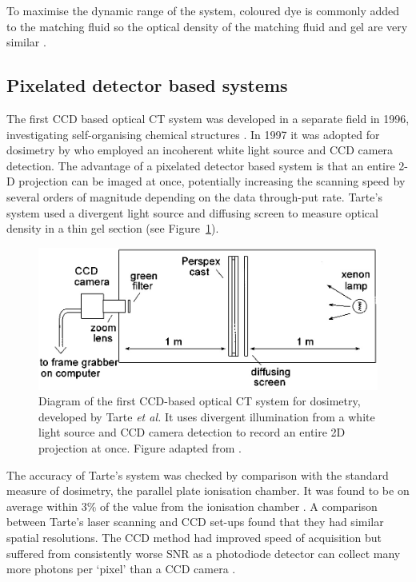 	To maximise the dynamic range of the system, coloured dye is commonly added to the matching fluid so the optical density of the matching fluid and gel are very similar \cite{Krstajic:2006kna}. 
	
	
	
	
	\subsection{Pixelated detector based systems}
	
	The first CCD based optical CT system was developed in a separate field in 1996, investigating self-organising chemical structures \cite{Winfree:1996}.
	In 1997 it was adopted for dosimetry by \cite{Tarte:2007} who employed an incoherent white light source and CCD camera detection. The advantage  of a pixelated detector based system  is that an entire 2-D projection can be imaged at once, potentially increasing the scanning speed by several  orders of magnitude depending on the data through-put rate. Tarte's system used a divergent light source and diffusing screen to measure optical density in a thin gel section (see Figure~\ref{fig:tarte_ccd_setup}). 
	
	\begin{figure}[H]
		\centering
		\includegraphics[scale=0.4]{intro_img/Tarte_1997_ccdsetup.jpg}
		\caption{Diagram of the first CCD-based  optical CT system for dosimetry, developed by Tarte \textit{et al.} It uses  divergent illumination from a white light source and CCD camera detection to record an entire 2D projection at once.   Figure adapted from \cite{Tarte:2007}. }
		\label{fig:tarte_ccd_setup}
	\end{figure}
	
	
	The accuracy of Tarte's system  was checked by comparison with the standard measure of dosimetry, the parallel plate ionisation chamber. It was found to be on average within 3\% of the value from the ionisation chamber \cite{Tarte:2007}. A comparison between Tarte's laser scanning and CCD set-ups found that they had similar spatial resolutions. The CCD method had improved speed of acquisition but suffered from consistently worse SNR as a photodiode detector can collect many more photons per `pixel' than a CCD camera \cite{Tarte:2007}.
	
